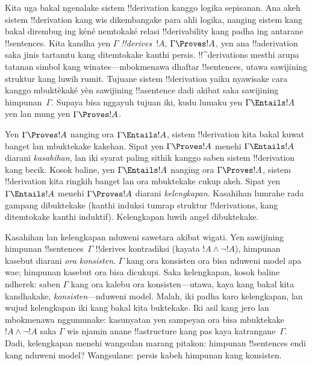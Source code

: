 \documentclass[../../../include/open-logic-section]{subfiles}
\begin{document}


Kita uga bakal ngenalake sistem !!{derivation} kanggo logika sepisanan. Ana
akeh sistem !!{derivation} kang wis dikembangake para ahli logika, nanging
sistem kang bakal dirembug ing kéné nemtokaké relasi !!{derivability} kang padha ing antarane
!!{sentence}s. Kita kandha yen $\Gamma$ \emph{!!{derive}s}~$!A$,
$\Gamma \Proves !A$, yen ana !!a{derivation} saka jinis tartamtu kang
ditemtokake kanthi persis. !!^{derivation}s mesthi arupa tatanan simbol
kang winates---mbokmenawa dhaftar !!{sentence}s, utawa sawijining
struktur kang luwih rumit. Tujuane sistem !!{derivation} yaiku nyawisake
cara kanggo mbuktèkaké yèn sawijining !!a{sentence} dadi akibat saka sawijining
himpunan~$\Gamma$. Supaya bisa nggayuh tujuan iki, kudu lumaku yen
$\Gamma \Entails !A$ yen lan mung yen $\Gamma \Proves !A$.

Yen $\Gamma \Proves !A$ nanging ora $\Gamma \Entails !A$, sistem
!!{derivation} kita bakal kuwat banget lan mbuktekake kakehan. Sipat yen
$\Gamma \Proves !A$ menehi $\Gamma \Entails !A$ diarani
\emph{kasahihan}, lan iki syarat paling sithik kanggo saben sistem
!!{derivation} kang becik. Kosok baline, yen $\Gamma \Entails !A$
nanging ora $\Gamma \Proves !A$, sistem !!{derivation} kita ringkih
banget lan ora mbuktekake cukup akeh. Sipat yen $\Gamma \Entails !A$
menehi $\Gamma \Proves !A$ diarani \emph{kelengkapan}. Kasahihan
lumrahe rada gampang dibuktekake (kanthi induksi tumrap struktur
!!{derivation}s, kang ditemtokake kanthi induktif). Kelengkapan luwih
angel dibuktekake.

Kasahihan lan kelengkapan nduweni sawetara akibat wigati. Yen sawijining
himpunan !!{sentence}s~$\Gamma$ !!{derive}s kontradiksi (kayata
$!A \land \lnot !A$), himpunan kasebut diarani \emph{ora konsisten}.
$\Gamma$ kang ora konsisten ora bisa nduweni model apa wae; himpunan
kasebut ora bisa dicukupi. Saka kelengkapan, kosok baline ndherek: saben
$\Gamma$ kang ora kalebu ora konsisten---utawa, kaya kang bakal kita
kandhakake, \emph{konsisten}---nduweni model. Malah, iki padha karo
kelengkapan, lan wujud kelengkapan iki kang bakal kita buktekake. Iki
asil kang jero lan mbokmenawa nggumunake: kasunyatan yen sampeyan ora
bisa mbuktekake $!A \land \lnot !A$ saka $\Gamma$ wis njamin anane
!!a{structure} kang pas kaya katrangane~$\Gamma$. Dadi, kelengkapan
menehi wangsulan marang pitakon: himpunan !!{sentence}s endi kang nduweni
model? Wangsulane: persis kabeh himpunan kang konsisten.
\end{document}
